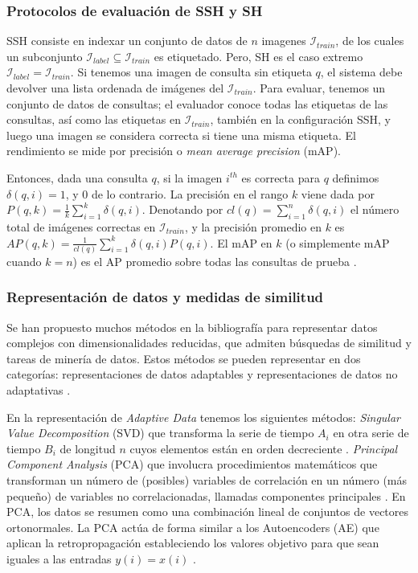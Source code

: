 \subsubsection{Protocolos de evaluación de SSH y SH}
SSH consiste en indexar un conjunto de datos de $ n $ imagenes $ \mathcal{I}_{train} $, de los cuales un subconjunto $ \mathcal{I}_{label} \subseteq \mathcal{I}_{train} $ es etiquetado. Pero, SH es el caso extremo $ \mathcal{I}_{label} = \mathcal{I}_{train} $. Si tenemos una imagen de consulta sin etiqueta $ q $, el sistema debe devolver una lista ordenada de imágenes del $ \mathcal{I}_{train} $. Para evaluar, tenemos un conjunto de datos de consultas; el evaluador conoce todas las etiquetas de las consultas, así como las etiquetas en $ \mathcal{I}_{train} $, también en la configuración SSH, y luego una imagen se considera correcta si tiene una misma etiqueta. El rendimiento se mide por precisión o \textit{mean average precision} (mAP).

Entonces, dada una consulta $ q $, si la imagen $ i^{th} $ es correcta para $ q $ definimos $ \delta(q, i) = 1 $, y $ 0 $ de lo contrario. La precisión en el rango $ k $ viene dada por $ P(q, k) = \tfrac{1}{k} {\sum}_{i = 1}^{k} \delta(q, i) $. Denotando por $ cl(q) = {\sum}_{i = 1}^{n} \delta(q, i) $ el número total de imágenes correctas en $ \mathcal{I}_{train} $, y la precisión promedio en $ k $ es $ AP(q, k) = \tfrac{1}{cl(q)} {\sum}_{i = 1}^{k} \delta(q, i) P( q, i) $. El mAP en $ k $ (o simplemente mAP cuando $ k = n $) es el AP promedio sobre todas las consultas de prueba \cite{sablayrolles2016should}.

\subsubsection{Representación de datos y medidas de similitud}\label{sec:methods_reduce}
Se han propuesto muchos métodos en la bibliografía para representar datos complejos con dimensionalidades reducidas, que admiten búsquedas de similitud y tareas de minería de datos. Estos métodos se pueden representar en dos categorías: representaciones de datos adaptables y representaciones de datos no adaptativas \cite{wang13}.

En la representación de \textit{Adaptive Data} tenemos los siguientes métodos: \textit{Singular Value Decomposition} (SVD) que transforma la serie de tiempo $ A_i $ en otra serie de tiempo $ B_i $ de longitud $ n $ cuyos elementos están en orden decreciente \cite{Bettaiah14}. \textit{Principal Component Analysis} (PCA) que involucra procedimientos matemáticos que transforman un número de (posibles) variables de correlación en un número (más pequeño) de variables no correlacionadas, llamadas componentes principales \cite{wekwek}. En PCA, los datos se resumen como una combinación lineal de conjuntos de vectores ortonormales. La PCA actúa de forma similar a los Autoencoders (AE) que aplican la retropropagación estableciendo los valores objetivo para que sean iguales a las entradas $ y(i) = x(i) $ \cite{wekwek}.


